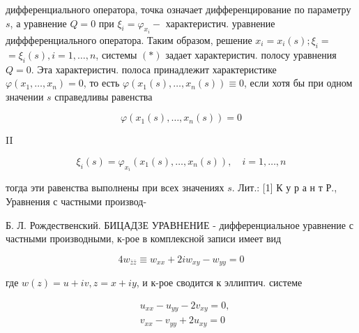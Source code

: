 \documentclass[10pt]{article}
\begin{document}
дифференциального оператора, точка означает дифференцирование по параметру $s$, а уравнение $Q=0$ при $\xi_{i}=\varphi_{x_{i}}-$ характеристич. уравнение диффференциального оператора. Таким образом, решение $x_{i}=x_{i}(s) ; \xi_{i}=$ $=\xi_{i}(s), i=1, \ldots, n$, системы $(*)$ задает характеристич. полосу уравнения $Q=0$. Эта характеристич. полоса принадлежит характеристике $\varphi\left(x_{1}, \ldots, x_{n}\right)=0$, то есть $\varphi\left(x_{1}(s), \ldots, x_{n}(s)\right) \equiv 0$, если хотя бы при одном значении $s$ справедливы равенства



\[

\varphi\left(x_{1}(s), \ldots, x_{n}(s)\right)=0

\]



II



\[

\xi_{i}(s)=\varphi_{x_{i}}\left(x_{1}(s), \ldots, x_{n}(s)\right), \quad i=1, \ldots, n

\]



тогда эти равенства выполнены при всех значениях $s$. Лит.: [1] К у р а н т Р., Уравнения с частными производ-

Б. Л. Рождественский. БИЦАДЗЕ УРАВНЕНИЕ - дифференциальное уравнение с частными производными, к-рое в комплексной записи имеет вид



\[

4 w_{\bar{z} \bar{z}} \equiv w_{x x}+2 i w_{x y}-w_{y y}=0

\]



где $w(z)=u+i v, z=x+i y$, и к-рое сводится к эллиптич. системе



\[

\begin{aligned}

& u_{x x}-u_{y y}-2 v_{x y}=0, \\

& v_{x x}-v_{y y}+2 u_{x y}=0

\end{aligned}

\]
\end{document}
